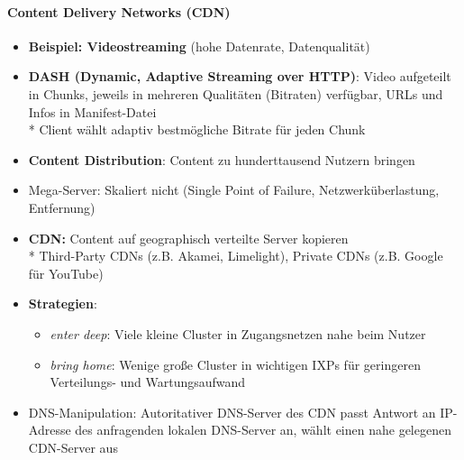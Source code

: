 \paragraph{Content Delivery Networks (CDN)}
\begin{itemize}
	\item \textbf{Beispiel: Videostreaming} (hohe Datenrate, Datenqualität)
	\item \textbf{DASH (Dynamic, Adaptive Streaming over HTTP)}: Video aufgeteilt in Chunks, jeweils in mehreren Qualitäten (Bitraten) verfügbar, URLs und Infos in Manifest-Datei\\*
	Client wählt adaptiv bestmögliche Bitrate für jeden Chunk
	\item \textbf{Content Distribution}: Content zu hunderttausend Nutzern bringen
	\item Mega-Server: Skaliert nicht (Single Point of Failure, Netzwerküberlastung, Entfernung)
	\item \textbf{CDN:} Content auf geographisch verteilte Server kopieren\\*
		Third-Party CDNs (z.B. Akamei, Limelight), Private CDNs (z.B. Google für YouTube)
	\item \textbf{Strategien}:
	\begin{itemize}
    \item \emph{enter deep}: Viele kleine Cluster in Zugangsnetzen nahe beim Nutzer
    \item \emph{bring home}: Wenige große Cluster in wichtigen IXPs für geringeren Verteilungs- und Wartungsaufwand
  \end{itemize}
	\item DNS-Manipulation: Autoritativer DNS-Server des CDN passt Antwort an IP-Adresse des anfragenden lokalen DNS-Server an, wählt einen nahe gelegenen CDN-Server aus
\end{itemize}
